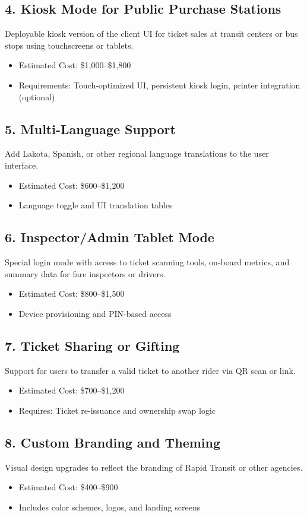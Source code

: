 \documentclass[12pt]{article}
\begin{document}
\subsection*{4. Kiosk Mode for Public Purchase Stations}
Deployable kiosk version of the client UI for ticket sales at transit centers or bus stops using touchscreens or tablets.
\begin{itemize}
    \item Estimated Cost: \$1,000–\$1,800
    \item Requirements: Touch-optimized UI, persistent kiosk login, printer integration (optional)
\end{itemize}

\subsection*{5. Multi-Language Support}
Add Lakota, Spanish, or other regional language translations to the user interface.
\begin{itemize}
    \item Estimated Cost: \$600–\$1,200
    \item Language toggle and UI translation tables
\end{itemize}

\subsection*{6. Inspector/Admin Tablet Mode}
Special login mode with access to ticket scanning tools, on-board metrics, and summary data for fare inspectors or drivers.
\begin{itemize}
    \item Estimated Cost: \$800–\$1,500
    \item Device provisioning and PIN-based access
\end{itemize}

\subsection*{7. Ticket Sharing or Gifting}
Support for users to transfer a valid ticket to another rider via QR scan or link.
\begin{itemize}
    \item Estimated Cost: \$700–\$1,200
    \item Requires: Ticket re-issuance and ownership swap logic
\end{itemize}

\subsection*{8. Custom Branding and Theming}
Visual design upgrades to reflect the branding of Rapid Transit or other agencies.
\begin{itemize}
    \item Estimated Cost: \$400–\$900
    \item Includes color schemes, logos, and landing screens
\end{itemize}
\end{document}

